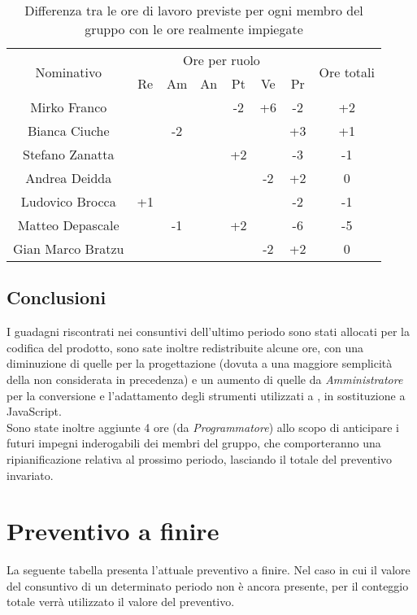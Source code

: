 \begin{flushleft}
\begin{table}[!h]
\begin{center}
\begin{tabularx}{\textwidth}{|c|cccccc|c|}
				\hline
				\multirow{2}{*}{Nominativo} & \multicolumn{6}{c|}{Ore per ruolo} & \multirow{2}{*}{Ore totali} \\ \cline{2-7}
				& Re & Am & An & Pt & Ve & Pr &      \\ \hline
				\endhead
				Mirko Franco       &   &  &   & -2  & +6 & -2  & +2        \\ \hline
				Bianca Ciuche      &   & -2  &   &   &  & +3  & +1        \\ \hline
				Stefano Zanatta    &   &  &   &	 +2 &  &  -3 & -1        \\ \hline
				Andrea Deidda      &   &  &   &   & -2 & +2  & 0  		\\ \hline
				Ludovico Brocca    &  +1 &  &   &   &  & -2  & -1        \\ \hline
				Matteo Depascale   &   & -1&  & +2&  &	-6 & -5  		\\ \hline
				Gian Marco Bratzu  & &  &   &   & -2 & +2  & 0        \\ \hline
				
			\end{tabularx}
			\caption{Differenza tra le ore di lavoro previste per ogni membro del gruppo con le ore realmente impiegate }
		\end{center}
	\end{table}

	\subsection{Conclusioni}
	I guadagni riscontrati nei consuntivi dell'ultimo periodo sono stati allocati per la codifica del prodotto, sono sate inoltre redistribuite alcune ore, con una diminuzione di quelle per la progettazione (dovuta a una maggiore semplicità della  non considerata in precedenza) e un aumento di quelle da \textit{Amministratore} per la conversione e l'adattamento degli strumenti utilizzati a , in sostituzione a JavaScript.\\
	Sono state inoltre aggiunte 4 ore (da \textit{Programmatore}) allo scopo di anticipare i futuri impegni inderogabili dei membri del gruppo, che comporteranno una ripianificazione relativa al prossimo periodo, lasciando il totale del preventivo invariato.\\
	
\section{Preventivo a finire}
	La seguente tabella presenta l’attuale preventivo a finire. Nel caso in cui il
	valore del consuntivo di un determinato periodo non è ancora presente, per
	il conteggio totale verrà utilizzato il valore del preventivo.
	

\end{flushleft}
